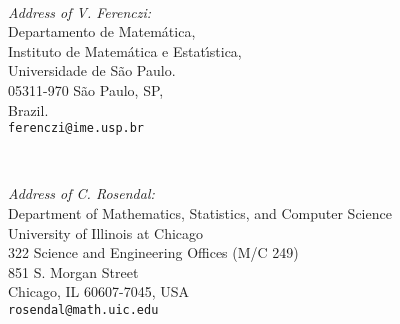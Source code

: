 \documentclass[10pt]{amsart}
\numberwithin{equation}{section}
\begin{document}
\

\begin{flushleft}

{\em Address of V. Ferenczi:}\\
Departamento de Matem\'atica,\\
Instituto de Matem\'atica e Estat\' \i stica,\\
Universidade de S\~ao Paulo.\\
05311-970 S\~ao Paulo, SP,\\
Brazil.\\
\texttt{ferenczi@ime.usp.br}
\end{flushleft}

\

\begin{flushleft}
{\em Address of C. Rosendal:}\\
Department of Mathematics, Statistics, and Computer Science\\
University of Illinois at Chicago\\
322 Science and Engineering Offices (M/C 249)\\
851 S. Morgan Street\\
Chicago, IL 60607-7045, USA\\
\texttt{rosendal@math.uic.edu}
\end{flushleft}
\end{document}
